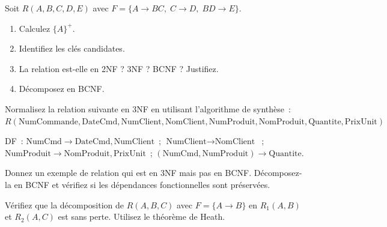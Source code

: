\begin{exercice}
Soit $R(A, B, C, D, E)$ avec $F = \{A \to BC, \; C \to D, \; BD \to E\}$.
\begin{enumerate}
    \item Calculez $\{A\}^+$.
    \item Identifiez les cl\'es candidates.
    \item La relation est-elle en 2NF ? 3NF ? BCNF ? Justifiez.
    \item D\'ecomposez en BCNF.
\end{enumerate}
\end{exercice}

\begin{exercice}
Normalisez la relation suivante en 3NF en utilisant l'algorithme de synth\`ese~:
$R(\text{NumCommande}, \text{DateCmd}, \text{NumClient}, \text{NomClient},
\text{NumProduit}, \text{NomProduit}, \text{Quantite}, \text{PrixUnit})$

DF~: $\text{NumCmd} \to \text{DateCmd}, \text{NumClient}$~;
$\text{NumClient} \to \text{NomClient}$~;
$\text{NumProduit} \to \text{NomProduit}, \text{PrixUnit}$~;
$(\text{NumCmd}, \text{NumProduit}) \to \text{Quantite}$.
\end{exercice}

\begin{exercice}
Donnez un exemple de relation qui est en 3NF mais pas en BCNF.
D\'ecomposez-la en BCNF et v\'erifiez si les d\'ependances fonctionnelles
sont pr\'eserv\'ees.
\end{exercice}

\begin{exercice}
V\'erifiez que la d\'ecomposition de $R(A, B, C)$ avec $F = \{A \to B\}$ en
$R_1(A, B)$ et $R_2(A, C)$ est sans perte. Utilisez le th\'eor\`eme de Heath.
\end{exercice}
